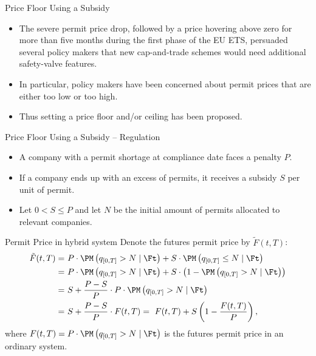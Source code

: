 
{Price Floor Using a Subsidy}
\begin{itemize}
\item<1-> The severe permit price drop, followed by a price hovering above zero for more than five months during the first phase of the EU ETS, persuaded several policy makers that new cap-and-trade schemes would need additional safety-valve features.
\item<2-> In particular, policy makers have been concerned about permit prices that are either too low or too high.
\item<3-> Thus setting a price floor and/or ceiling has been proposed.
\end{itemize}

{Price Floor Using a Subsidy -- Regulation}
\begin{itemize}
\item<1-> A company with a permit shortage at compliance date faces a penalty $P$.
\item<2-> If a company ends up with an excess of permits, it receives a subsidy $S$ per unit of permit.
\item<3-> Let $0<S\leq P$ and let $N$ be the initial amount of permits allocated to relevant companies.
\end{itemize}

{Permit Price in hybrid system}
Denote the futures permit price by $\tilde{F}(t,T)$:
\begin{align*}
\tilde{F}(t,T) =& \ P \cdot \PM \left( q_{[0,T]} > N \mid \Ft \right) + S \cdot \PM \left( q_{[0,T]} \le N \mid \Ft \right) \\
  =& \ P \cdot \PM \left( q_{[0,T]} > N \mid \Ft \right) + S \cdot \left( 1 - \PM \left( q_{[0,T]} > N \mid \Ft \right)\right) \\
  =& \ S + \frac{P-S}{P} \cdot P \cdot \PM \left( q_{[0,T]} > N \mid \Ft \right) \\
  =& \ S + \frac{P-S}{P} \cdot F(t,T) = \ F(t,T) + S\left(1 - \frac{F(t,T)}{P}\right),
\end{align*}
where $F(t,T) = P \cdot \PM \left( q_{[0,T]} > N \mid \Ft \right)$ is the futures permit price in an ordinary system.

